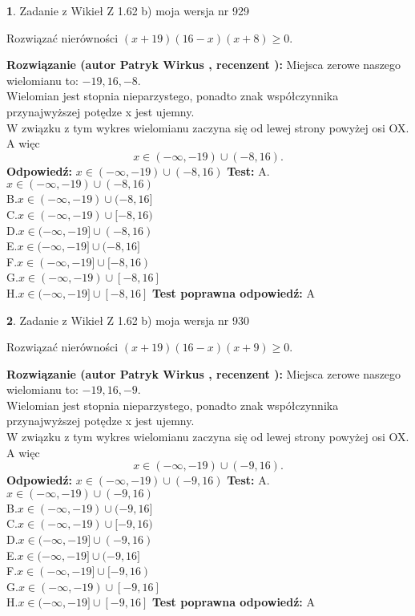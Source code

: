 \documentclass[12pt, a4paper]{article}
\theoremstyle{definition} %
\newtheorem{zad}{}
\newcommand{\zadStart}[1]{\begin{zad}#1\newline}
\newcommand{\zadStop}{\end{zad}}
\newcommand{\rozwStart}[2]{\noindent \textbf{Rozwiązanie (autor #1 , recenzent #2): }\newline}
\newcommand{\rozwStop}{\newline}
\newcommand{\odpStart}{\noindent \textbf{Odpowiedź:}\newline}
\newcommand{\odpStop}{\newline}
\newcommand{\testStart}{\noindent \textbf{Test:}\newline}
\newcommand{\testStop}{\newline}
\newcommand{\kluczStart}{\noindent \textbf{Test poprawna odpowiedź:}\newline}
\newcommand{\kluczStop}{\newline}
\begin{document}
\zadStart{Zadanie z Wikieł Z 1.62 b) moja wersja nr 929}

Rozwiązać nierówności $(x+19)(16-x)(x+8)\ge0$.
\zadStop
\rozwStart{Patryk Wirkus}{}
Miejsca zerowe naszego wielomianu to: $-19, 16, -8$.\\
Wielomian jest stopnia nieparzystego, ponadto znak współczynnika przy\linebreak najwyższej potędze x jest ujemny.\\ W związku z tym wykres wielomianu zaczyna się od lewej strony powyżej osi OX. A więc $$x \in (-\infty,-19) \cup (-8,16).$$
\rozwStop
\odpStart
$x \in (-\infty,-19) \cup (-8,16)$
\odpStop
\testStart
A.$x \in (-\infty,-19) \cup (-8,16)$\\
B.$x \in (-\infty,-19) \cup (-8,16]$\\
C.$x \in (-\infty,-19) \cup [-8,16)$\\
D.$x \in (-\infty,-19] \cup (-8,16)$\\
E.$x \in (-\infty,-19] \cup (-8,16]$\\
F.$x \in (-\infty,-19] \cup [-8,16)$\\
G.$x \in (-\infty,-19) \cup [-8,16]$\\
H.$x \in (-\infty,-19] \cup [-8,16]$
\testStop
\kluczStart
A
\kluczStop



\zadStart{Zadanie z Wikieł Z 1.62 b) moja wersja nr 930}

Rozwiązać nierówności $(x+19)(16-x)(x+9)\ge0$.
\zadStop
\rozwStart{Patryk Wirkus}{}
Miejsca zerowe naszego wielomianu to: $-19, 16, -9$.\\
Wielomian jest stopnia nieparzystego, ponadto znak współczynnika przy\linebreak najwyższej potędze x jest ujemny.\\ W związku z tym wykres wielomianu zaczyna się od lewej strony powyżej osi OX. A więc $$x \in (-\infty,-19) \cup (-9,16).$$
\rozwStop
\odpStart
$x \in (-\infty,-19) \cup (-9,16)$
\odpStop
\testStart
A.$x \in (-\infty,-19) \cup (-9,16)$\\
B.$x \in (-\infty,-19) \cup (-9,16]$\\
C.$x \in (-\infty,-19) \cup [-9,16)$\\
D.$x \in (-\infty,-19] \cup (-9,16)$\\
E.$x \in (-\infty,-19] \cup (-9,16]$\\
F.$x \in (-\infty,-19] \cup [-9,16)$\\
G.$x \in (-\infty,-19) \cup [-9,16]$\\
H.$x \in (-\infty,-19] \cup [-9,16]$
\testStop
\kluczStart
A
\kluczStop
\end{document}
